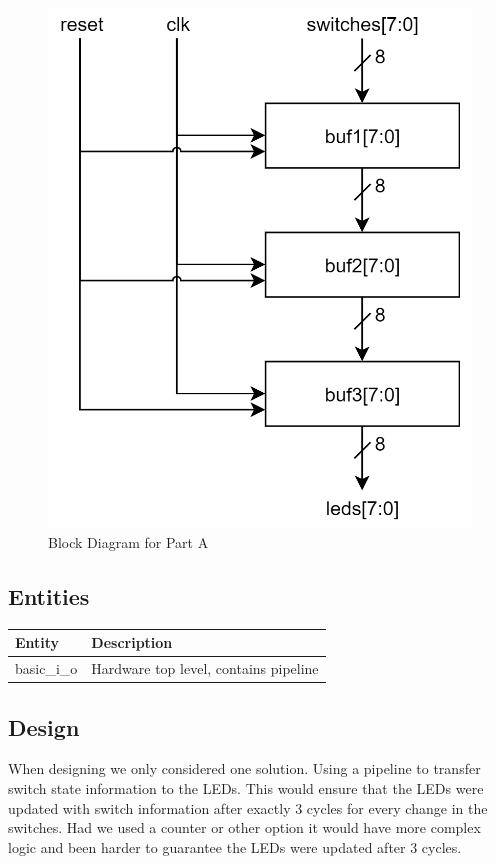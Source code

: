 \documentclass[letterpaper, 10 pt, conference]{IEEEconf}  %
\begin{document}
\begin{figure}[thpb]
   \centering
   \parbox{3in}{\centering\includegraphics[scale=0.25]{img/mp1a_diagram.PNG}}
   \caption{Block Diagram for Part A}
   \label{figurelabel}
\end{figure}

\subsection{Entities}
\begin{table}[H]
\begin{tabular}{|l|l|}
\hline
\rowcolor[HTML]{EFEFEF} 
Entity      & Description                           \\ \hline
basic\_i\_o & Hardware top level, contains pipeline \\ \hline
\end{tabular}
\end{table}

\subsection{Design}
When designing we only considered one solution. Using a pipeline to transfer switch state information to the LEDs. This would ensure that the LEDs were updated with switch information after exactly 3 cycles for every change in the switches. Had we used a counter or other option it would have more complex logic and been harder to guarantee the LEDs were updated after 3 cycles.
\end{document}
